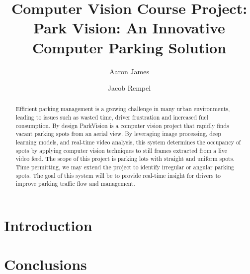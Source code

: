 \documentclass[12pt, letterpaper, twoside]{article}
\title{\textbf{Computer Vision Course Project:\\Park Vision: An Innovative Computer Parking Solution}} %
\author{Aaron James \and Jacob Rempel} %
\affiliation{Ontario Tech University} %
\begin{document}
\maketitle

\begin{abstract}
    \noindent
    
Efficient parking management is a growing challenge in many urban environments, leading to issues such as wasted time, driver frustration and increased fuel consumption. By design ParkVision is a computer vision project that rapidly finds vacant parking spots from an aerial view. By leveraging image processing, deep learning models, and real-time video analysis, this system determines the occupancy of spots by applying computer vision techniques to still frames extracted from a live video feed. The scope of this project is parking lots with straight and uniform spots. Time permitting, we may extend the project to identify irregular or angular parking spots. The goal of this system will be to provide real-time insight for drivers to improve parking traffic flow and management.



\end{abstract}

\vspace{2.5cm}


\thispagestyle{firstpage}

\pagebreak


\newgeometry{} %

\section{Introduction}
\label{sec:intro}

\blindmathpaper %

\section{Conclusions}
\label{sec:conc}
\end{document}
